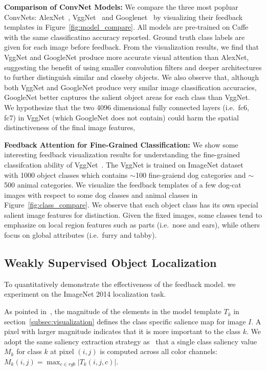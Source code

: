 \textbf{Comparison of ConvNet Models:} We compare the three most popluar ConvNets: AlexNet~\cite{Krizhevsky2012ImageNet}, VggNet~\cite{Simonyan2014Very} and Googlenet~\cite{Szegedy2014Going} by visualizing their feedback templates in Figure~\ref{fig:model_compare}. All models are pre-trained on Caffe with the same classificatino accuracy reported. Ground truth class labels are given for each image before feedback. From the visualization results, we find that VggNet and GoogleNet produce more accurate visual attention than AlexNet, suggesting the benefit of using smaller convolution filters and deeper architectures to further distinguish similar and closeby objects. We also observe that, although both VggNet and GoogleNet produce very smilar image classification accuracies, GoogleNet better captures the salient object areas for each class than VggNet. We hypothesize that the two 4096 dimensional fully connected layers (i.e.\ fc6, fc7) in VggNet (which GoogleNet does not contain) could harm the spatial distinctiveness of the final image features,  

\textbf{Feedback Attention for Fine-Grained Classification:} We show some interesting feedback visualization results for understanding the fine-grained classifcation ability of VggNet~\cite{Simonyan2014Very}. The VggNet is trained on ImageNet dataset~\cite{deng2009imagenet} with 1000 object classes which contains $\sim$100 fine-graiend dog categories and $\sim$500 animal categories. We visualize the feedback templates of a few dog-cat images with respect to some dog classes and animal classes in Figure~\ref{fig:class_compare}. We observe that each object class has its own special salient image features for distinction. Given the fixed images, some classes tend to emphasize on local region features such as parts (i.e.\ nose and ears), while others focus on global attributes (i.e.\ furry and tabby).

\subsection{Weakly Supervised Object Localization}
\label{subsec:localization}
To quantitatively demonstrate the effectiveness of the feedback model. we experiment on the ImageNet 2014 localization task.

As pointed in~\cite{simonyan2013deep}, the magnitude of the elements in the model template $T_k$ in section~\ref{subsec:visualization} defines the class specific salience map for image $I$. A pixel with larger magnitude indicates that it is more important to the class $k$. We adopt the same saliency extraction strategy as~\cite{simonyan2013deep} that a single class saliency value $M_k$ for class $k$ at pixel $(i,j)$ is computed across all color channels: $M_k(i,j) = \max_{c \in rgb} | T_k(i,j,c) |$.


